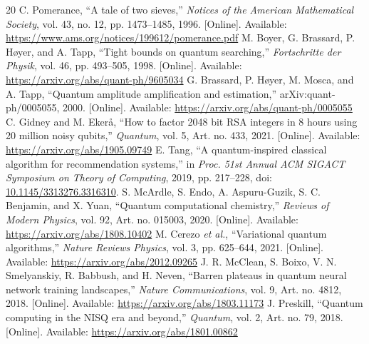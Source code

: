 \documentclass[conference]{IEEEtran}
\begin{document}
\begin{thebibliography}{20}
 C. Pomerance, ``A tale of two sieves,'' \emph{Notices of the American Mathematical Society}, vol. 43, no. 12, pp. 1473--1485, 1996. [Online]. Available: \url{https://www.ams.org/notices/199612/pomerance.pdf}
 M. Boyer, G. Brassard, P. H\o yer, and A. Tapp, ``Tight bounds on quantum searching,'' \emph{Fortschritte der Physik}, vol. 46, pp. 493--505, 1998. [Online]. Available: \url{https://arxiv.org/abs/quant-ph/9605034}
 G. Brassard, P. H\o yer, M. Mosca, and A. Tapp, ``Quantum amplitude amplification and estimation,'' arXiv:quant-ph/0005055, 2000. [Online]. Available: \url{https://arxiv.org/abs/quant-ph/0005055}
 C. Gidney and M. Eker\aa{}, ``How to factor 2048 bit RSA integers in 8 hours using 20 million noisy qubits,'' \emph{Quantum}, vol. 5, Art. no. 433, 2021. [Online]. Available: \url{https://arxiv.org/abs/1905.09749}
 E. Tang, ``A quantum-inspired classical algorithm for recommendation systems,'' in \emph{Proc. 51st Annual ACM SIGACT Symposium on Theory of Computing}, 2019, pp. 217--228, doi: \href{https://doi.org/10.1145/3313276.3316310}{10.1145/3313276.3316310}.
 S. McArdle, S. Endo, A. Aspuru-Guzik, S. C. Benjamin, and X. Yuan, ``Quantum computational chemistry,'' \emph{Reviews of Modern Physics}, vol. 92, Art. no. 015003, 2020. [Online]. Available: \url{https://arxiv.org/abs/1808.10402}
 M. Cerezo \emph{et al.}, ``Variational quantum algorithms,'' \emph{Nature Reviews Physics}, vol. 3, pp. 625--644, 2021. [Online]. Available: \url{https://arxiv.org/abs/2012.09265}
 J. R. McClean, S. Boixo, V. N. Smelyanskiy, R. Babbush, and H. Neven, ``Barren plateaus in quantum neural network training landscapes,'' \emph{Nature Communications}, vol. 9, Art. no. 4812, 2018. [Online]. Available: \url{https://arxiv.org/abs/1803.11173}
 J. Preskill, ``Quantum computing in the NISQ era and beyond,'' \emph{Quantum}, vol. 2, Art. no. 79, 2018. [Online]. Available: \url{https://arxiv.org/abs/1801.00862}
\end{thebibliography}
\end{document}
